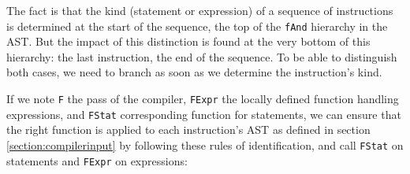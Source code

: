 \documentclass[a4paper]{memoir}
\begin{document}
The fact is that the kind (statement or
expression) of a sequence of instructions is determined at the start of the
sequence, the top of the \lstinline!fAnd! hierarchy in the AST. But the impact of this
distinction is found at the very bottom of this hierarchy: the last
instruction, the end of the sequence. To be able to distinguish both cases, we
need to branch as soon as we determine the instruction's kind.

If we note \lstinline!F! the pass of the compiler, \lstinline!FExpr! the locally defined
function handling expressions, and \lstinline!FStat! corresponding function for
statements, we can ensure that the right function is applied to each
instruction's AST as defined in section \ref{section:compilerinput} by following
these rules of identification, and call \lstinline!FStat! on statements and
\lstinline!FExpr! on expressions:
\end{document}
